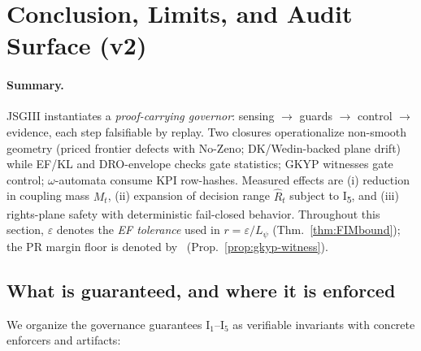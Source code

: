 \section{Conclusion, Limits, and Audit Surface (v2)}\label{sec:conclusion-v2}

\paragraph{Summary.}
JSGIII instantiates a \emph{proof-carrying governor}: sensing $\to$ guards $\to$ control $\to$ evidence, each step falsifiable by replay. Two closures operationalize non-smooth geometry (priced frontier defects with No-Zeno; DK/Wedin-backed plane drift) while EF/KL and DRO-envelope checks gate statistics; GKYP witnesses gate control; $\omega$-automata consume KPI row-hashes. Measured effects are (i) reduction in coupling mass $M_t$, (ii) expansion of decision range $\hat R_t$ subject to I\textsubscript{5}, and (iii) rights-plane safety with deterministic fail-closed behavior. Throughout this section, $\varepsilon$ denotes the \emph{EF tolerance} used in $r=\varepsilon/L_\psi$ (Thm.~\ref{thm:FIMbound}); the PR margin floor is denoted by \constsymPRmargin\ (Prop.~\ref{prop:gkyp-witness}).

\subsection{What is guaranteed, and where it is enforced}\label{subsec:claims}
\emph{}

We organize the governance guarantees I\(_1\)–I\(_5\) as verifiable invariants with concrete enforcers and artifacts:

